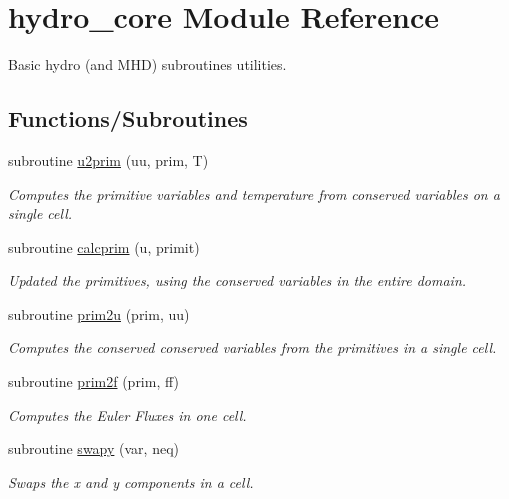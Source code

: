 \hypertarget{namespacehydro__core}{}\section{hydro\+\_\+core Module Reference}
\label{namespacehydro__core}


Basic hydro (and M\+H\+D) subroutines utilities.  


\subsection*{Functions/\+Subroutines}
\begin{DoxyCompactItemize}
\item 
subroutine \hyperlink{namespacehydro__core_a360e3d64343b30d94d270cfebc5b4eb3}{u2prim} (uu, prim, T)
\begin{DoxyCompactList}\small\item\em Computes the primitive variables and temperature from conserved variables on a single cell. \end{DoxyCompactList}\item 
subroutine \hyperlink{namespacehydro__core_a991a14316cc93864150071b30fd9c772}{calcprim} (u, primit)
\begin{DoxyCompactList}\small\item\em Updated the primitives, using the conserved variables in the entire domain. \end{DoxyCompactList}\item 
subroutine \hyperlink{namespacehydro__core_a98cafc8f97d7a1b3f8050b8e442194c3}{prim2u} (prim, uu)
\begin{DoxyCompactList}\small\item\em Computes the conserved conserved variables from the primitives in a single cell. \end{DoxyCompactList}\item 
subroutine \hyperlink{namespacehydro__core_a725c2c598f080ea420f4043dbda3f996}{prim2f} (prim, ff)
\begin{DoxyCompactList}\small\item\em Computes the Euler Fluxes in one cell. \end{DoxyCompactList}\item 
subroutine \hyperlink{namespacehydro__core_a64856096f7a7b7f65be1154d31916c2d}{swapy} (var, neq)
\begin{DoxyCompactList}\small\item\em Swaps the x and y components in a cell. \end{DoxyCompactList}\item 

\end{DoxyCompactItemize}
